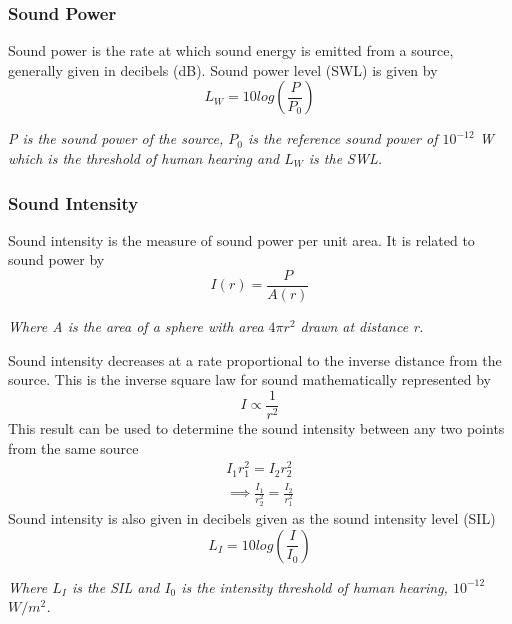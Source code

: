\documentclass[12pt, a4paper]{article}
\begin{document}
\subsubsection{Sound Power}
Sound power is the rate at which sound energy is emitted from a source, generally given in decibels (dB). Sound power level (SWL) is given by \cite{soundTerminology}
\begin{equation}
	\label{eqn:SWL}
	L_W = 10log\left(\frac{P}{P_0}\right)
\end{equation}
\begin{center}
	\textit{P is the sound power of the source, $P_0$ is the reference sound power of $10^{-12}$ W which is the threshold of human hearing and $L_W$ is the SWL. }
\end{center}

\subsubsection{Sound Intensity}

Sound intensity is the measure of sound power per unit area. It is related to sound power by
\begin{equation}
	\label{eqn:soundIntensityGeneralForm}
	I(r) = \frac{P}{A(r)}
\end{equation}
\begin{center}
	\textit{Where A is the area of a sphere with area $4\pi r^2$ drawn at distance r.} 
\end{center}
Sound intensity decreases at a rate proportional to the inverse distance from the source. This is the inverse square law for sound mathematically represented by
\begin{equation*}
	I \propto \frac{1}{r^2}
\end{equation*}
This result can be used to determine the sound intensity between any two points from the same source \cite{audioParameters}
\begin{equation}
	\begin{aligned}
		\label{eqn:soundIntensityDistanceProperty}
		I_1r_1^2 = I_2r_2^2 \\
		\implies \frac{I_1}{r_2^2} = \frac{I_2}{r_1^2}
	\end{aligned}
\end{equation}
Sound intensity is also given in decibels given as the sound intensity level (SIL) \cite{soundTerminology}
\begin{equation}
	\label{eqn:SIL}
	L_I = 10log\left(\frac{I}{I_0}\right)
\end{equation}
\begin{center}
\textit{Where $L_I$ is the SIL and $I_0$ is the intensity threshold of human hearing, $10^{-12}$ $W/m^2$.}
\end{center}
\end{document}
